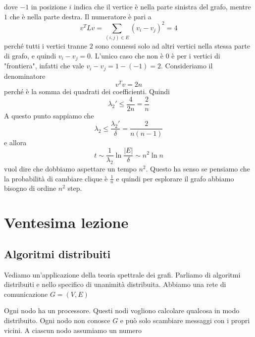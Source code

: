 \documentclass[12pt]{report}
\begin{document}
dove $-1$ in posizione $i$ indica che il vertice è nella parte sinistra del grafo, mentre $1$ che è nella parte destra.
Il numeratore è pari a 
$$v^T L v = \sum_{(i,j) \in E} (v_i - v_j)^2 = 4$$
perché tutti i vertici tranne $2$ sono connessi solo ad altri vertici nella stessa parte di grafo, e quindi $v_i - v_j = 0$. L'unico caso che non è $0$ è per i vertici di "frontiera", infatti che vale $v_i - v_j = 1- (-1) = 2$.
Consideriamo il denominatore
$$v^T v = 2n$$
perché è la somma dei quadrati dei coefficienti.
Quindi
$$\lambda_2' \leq \frac{4}{2n} = \frac{2}{n}$$
A questo punto sappiamo che
$$\lambda_2 \leq \frac{\lambda_2'}{\delta} = \frac{2}{n(n-1)}$$
e allora
$$t \sim \frac{1}{\lambda_2} \ln{\frac{|E|}{\delta}} \sim n^2 \ln{n}$$
vuol dire che dobbiamo aspettare un tempo $n^2$. Questo ha senso se pensiamo che la probabilità di cambiare clique è $\frac{1}{n}$ e quindi per esplorare il grafo abbiamo bisogno di ordine $n^2$ step.

\chapter{Ventesima lezione}

\section{Algoritmi distribuiti}

Vediamo un'applicazione della teoria spettrale dei grafi. Parliamo di algoritmi distribuiti e nello specifico di unanimità distribuita. Abbiamo una rete di comunicazione $G= (V,E)$

Ogni nodo ha un processore. Questi nodi vogliono calcolare qualcosa in modo distribuito. Ogni nodo non conosce $G$ e può solo scambiare messaggi con i propri vicini. A ciascun nodo assumiamo un numero
\end{document}
